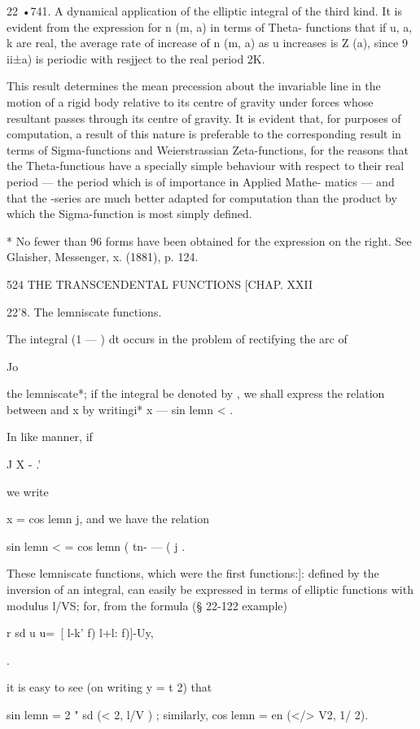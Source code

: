 22 •741. A dynamical application of the elliptic integral of the third
kind. It is evident from the expression for n (m, a) in terms of
Theta- functions that if u, a, k are real, the average rate of
increase of n (m, a) as u increases is Z (a), since 9 ii±a) is
periodic with resjject to the real period 2K.

This result determines the mean precession about the invariable line
in the motion of a rigid body relative to its centre of gravity under
forces whose resultant passes through its centre of gravity. It is
evident that, for purposes of computation, a result of this nature is
preferable to the corresponding result in terms of Sigma-functions and
Weierstrassian Zeta-functions, for the reasons that the
Theta-functious have a specially simple behaviour with respect to
their real period — the period which is of importance in Applied
Mathe- matics — and that the -series are much better adapted for
computation than the product by which the Sigma-function is most
simply defined.

* No fewer than 96 forms have been obtained for the expression on the
right. See Glaisher, Messenger, x. (1881), p. 124.

524 THE TRANSCENDENTAL FUNCTIONS [CHAP. XXII

22'8. The lemniscate functions.

The integral (1 — ) dt occurs in the problem of rectifying the arc of

Jo

the lemniscate*; if the integral be denoted by , we shall express the
relation between and x by writingi* x — sin lemn < .

In like manner, if

J X - .'

we write

x = cos lemn j, and we have the relation

sin lemn < = cos lemn ( tn- — ( j .

These lemniscate functions, which were the first functions:]: defined
by the inversion of an integral, can easily be expressed in terms of
elliptic functions with modulus l/VS; for, from the formula (§ 22-122
example)

r sd u u=\ [ l-k' f) l+l: f)]-Uy,

.

it is easy to see (on writing y = t \/2) that

sin lemn = 2 " sd (< \/2, l/V ) ; similarly, cos lemn = en (</> V2, 1/
2).

